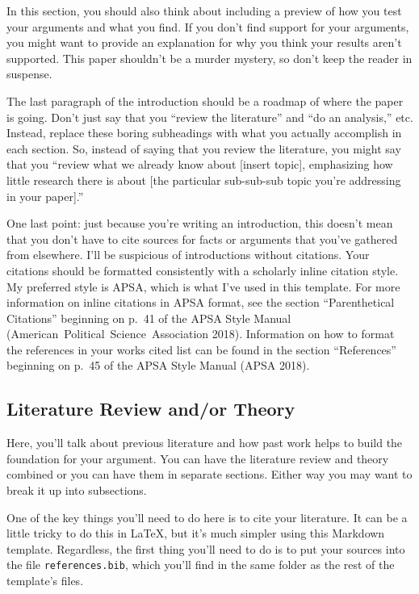 \documentclass[12pt]{article}
\begin{document}
In this section, you should also think about including a preview of how you test your arguments and what you find. If you don't find support for your arguments, you might want to provide an explanation for why you think your results aren't supported. This paper shouldn't be a murder mystery, so don't keep the reader in suspense.

The last paragraph of the introduction should be a roadmap of where the paper is going. Don't just say that you ``review the literature'' and ``do an analysis,'' etc. Instead, replace these boring subheadings with what you actually accomplish in each section. So, instead of saying that you review the literature, you might say that you ``review what we already know about {[}insert topic{]}, emphasizing how little research there is about {[}the particular sub-sub-sub topic you're addressing in your paper{]}.''

One last point: just because you're writing an introduction, this doesn't mean that you don't have to cite sources for facts or arguments that you've gathered from elsewhere. I'll be suspicious of introductions without citations. Your citations should be formatted consistently with a scholarly inline citation style. My preferred style is APSA, which is what I've used in this template. For more information on inline citations in APSA format, see the section ``Parenthetical Citations'' beginning on p.~41 of the APSA Style Manual (American~Political~Science~Association 2018). Information on how to format the references in your works cited list can be found in the section ``References'' beginning on p.~45 of the APSA Style Manual (APSA 2018).

\hypertarget{literature-review-andor-theory}{%
\subsection{Literature Review and/or Theory}\label{literature-review-andor-theory}}

Here, you'll talk about previous literature and how past work helps to build the foundation for your argument. You can have the literature review and theory combined or you can have them in separate sections. Either way you may want to break it up into subsections.

One of the key things you'll need to do here is to cite your literature. It can be a little tricky to do this in \LaTeX, but it's much simpler using this Markdown template. Regardless, the first thing you'll need to do is to put your sources into the file \texttt{references.bib}, which you'll find in the same folder as the rest of the template's files.
\end{document}
